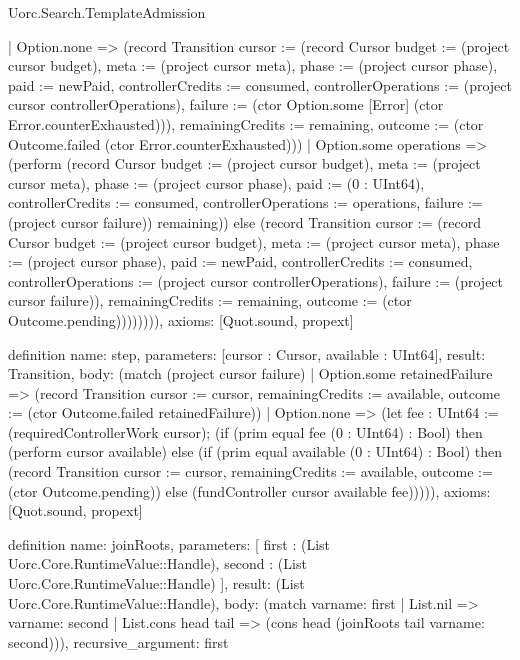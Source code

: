 \begin{lexlean}{Uorc.Search.TemplateAdmission}
\begin{semanticmodule}
{            | Option.none => (record Transition {cursor := (record Cursor {budget := (project cursor budget), meta := (project cursor meta), phase := (project cursor phase), paid := newPaid, controllerCredits := consumed, controllerOperations := (project cursor controllerOperations), failure := (ctor Option.some [Error] (ctor Error.counterExhausted))}), remainingCredits := remaining, outcome := (ctor Outcome.failed (ctor Error.counterExhausted))})
            | Option.some operations => (perform (record Cursor {budget := (project cursor budget), meta := (project cursor meta), phase := (project cursor phase), paid := (0 : UInt64), controllerCredits := consumed, controllerOperations := operations, failure := (project cursor failure)}) remaining)) else (record Transition {cursor := (record Cursor {budget := (project cursor budget), meta := (project cursor meta), phase := (project cursor phase), paid := newPaid, controllerCredits := consumed, controllerOperations := (project cursor controllerOperations), failure := (project cursor failure)}), remainingCredits := remaining, outcome := (ctor Outcome.pending)}))))))),
  axioms: [Quot.sound, propext]
}

definition{
  name: step,
  parameters: [cursor : Cursor, available : UInt64],
  result: Transition,
  body: (match (project cursor failure)
    | Option.some retainedFailure => (record Transition {cursor := cursor, remainingCredits := available, outcome := (ctor Outcome.failed retainedFailure)})
    | Option.none => (let fee : UInt64 := (requiredControllerWork cursor); (if (prim equal fee (0 : UInt64) : Bool) then (perform cursor available) else (if (prim equal available (0 : UInt64) : Bool) then (record Transition {cursor := cursor, remainingCredits := available, outcome := (ctor Outcome.pending)}) else (fundController cursor available fee))))),
  axioms: [Quot.sound, propext]
}

definition{
  name: joinRoots,
  parameters: [
    first : (List Uorc.Core.RuntimeValue::Handle),
    second : (List Uorc.Core.RuntimeValue::Handle)
  ],
  result: (List Uorc.Core.RuntimeValue::Handle),
  body: (match var{name: first}
    | List.nil => var{name: second}
    | List.cons head tail => (cons head (joinRoots tail var{name: second}))),
  recursive_argument: first
}


\end{semanticmodule}
\end{lexlean}
